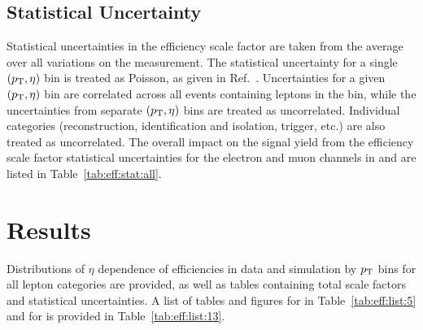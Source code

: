 \subsection{Statistical Uncertainty}
Statistical uncertainties in the efficiency scale factor are taken from the average over all variations on the measurement. The statistical uncertainty for a single $(p_{\mathrm{T}},\eta)$ bin is treated as Poisson, as given in Ref.~\cite{Paterno:2004cb}. Uncertainties for a given $(p_{\mathrm{T}},\eta)$ bin are correlated across all events containing leptons in the bin, while the uncertainties from separate $(p_{\mathrm{T}},\eta)$ bins are treated as uncorrelated. Individual categories (reconstruction, identification and isolation, trigger, etc.) are also treated as uncorrelated. The overall impact on the signal yield from the efficiency scale factor statistical uncertainties for the electron and muon channels in \serag and \serah are listed in Table~\ref{tab:eff:stat:all}.


% 
% 
% 
% 
% 
% 



\section{Results}\label{ch:eff:results}
Distributions of $\eta$ dependence of efficiencies in data and simulation by $p_{\mathrm{T}}$ bins for all lepton categories are provided, as well as tables containing total scale factors and statistical uncertainties. A list of tables and figures for \serag in Table~\ref{tab:eff:list:5} and for \serah is provided in Table~\ref{tab:eff:list:13}.






